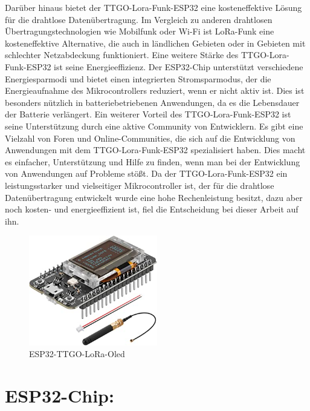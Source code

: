 Darüber hinaus bietet der TTGO-Lora-Funk-ESP32 eine kosteneffektive Lösung für die drahtlose Datenübertragung. Im Vergleich zu anderen drahtlosen Übertragungstechnologien wie Mobilfunk oder Wi-Fi ist LoRa-Funk eine kosteneffektive Alternative, die auch in ländlichen Gebieten oder in Gebieten mit schlechter Netzabdeckung funktioniert.
Eine weitere Stärke des TTGO-Lora-Funk-ESP32 ist seine Energieeffizienz. Der ESP32-Chip unterstützt verschiedene Energiesparmodi und bietet einen integrierten Stromsparmodus, der die Energieaufnahme des Mikrocontrollers reduziert, wenn er nicht aktiv ist. Dies ist besonders nützlich in batteriebetriebenen Anwendungen, da es die Lebensdauer der Batterie verlängert.
Ein weiterer Vorteil des TTGO-Lora-Funk-ESP32 ist seine Unterstützung durch eine aktive Community von Entwicklern. Es gibt eine Vielzahl von Foren und Online-Communities, die sich auf die Entwicklung von Anwendungen mit dem TTGO-Lora-Funk-ESP32 spezialisiert haben. Dies macht es einfacher, Unterstützung und Hilfe zu finden, wenn man bei der Entwicklung von Anwendungen auf Probleme stößt.
Da der TTGO-Lora-Funk-ESP32 ein leistungsstarker und vielseitiger Mikrocontroller ist, der für die drahtlose Datenübertragung entwickelt wurde eine hohe Rechenleistung besitzt, dazu aber noch kosten- und energieeffizient ist, fiel die Entscheidung bei dieser Arbeit auf ihn.

\begin{figure}[b]
    \centering
    \includegraphics[width=0.5\textwidth]{./pics/ttgoLoraOled.jpg}
    \caption{ESP32-TTGO-LoRa-Oled}
    \label{fig:TTGO-ESP32}
  \end{figure}

\newpage
\section{ESP32-Chip:}


